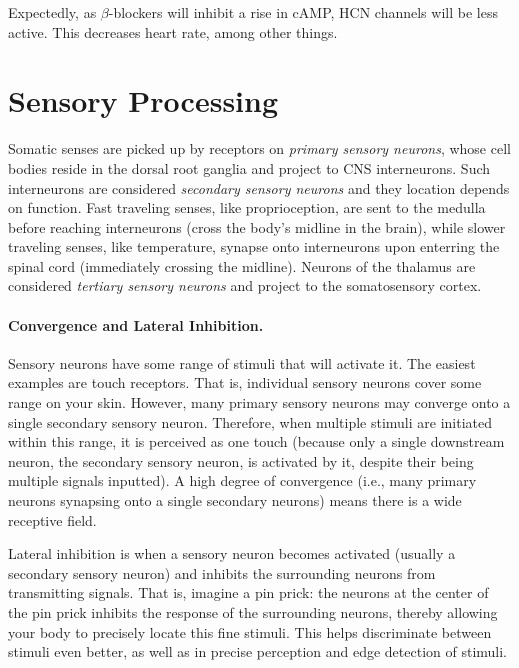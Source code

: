 \documentclass[12pt]{report}
\begin{document}
Expectedly, as $\beta$-blockers will inhibit a rise in cAMP, HCN channels will be less active. This decreases heart rate, among other things. 


\chapter{Sensory Processing}

Somatic senses are picked up by receptors on \textit{primary sensory neurons}, whose cell bodies reside in the dorsal root ganglia and project to CNS interneurons. Such interneurons are considered \textit{secondary sensory neurons} and they location depends on function. Fast traveling senses, like proprioception, are sent to the medulla before reaching interneurons (cross the body's midline in the brain), while slower traveling senses, like temperature, synapse onto interneurons upon enterring the spinal cord (immediately crossing the midline). Neurons of the thalamus are considered \textit{tertiary sensory neurons} and project to the somatosensory cortex. 

\subsubsection{Convergence and Lateral Inhibition.}

Sensory neurons have some range of stimuli that will activate it. The easiest examples are touch receptors. That is, individual sensory neurons cover some range on your skin. However, many primary sensory neurons may converge onto a single secondary sensory neuron. Therefore, when multiple stimuli are initiated within this range, it is perceived as one touch (because only a single downstream neuron, the secondary sensory neuron, is activated by it, despite their being multiple signals inputted). A high degree of convergence (i.e., many primary neurons synapsing onto a single secondary neurons) means there is a wide receptive field.\newline

Lateral inhibition is when a sensory neuron becomes activated (usually a secondary sensory neuron) and inhibits the surrounding neurons from transmitting signals. That is, imagine a pin prick: the neurons at the center of the pin prick inhibits the response of the surrounding neurons, thereby allowing your body to precisely locate this fine stimuli. This helps discriminate between stimuli even better, as well as in precise perception and edge detection of stimuli.\newline
\end{document}
